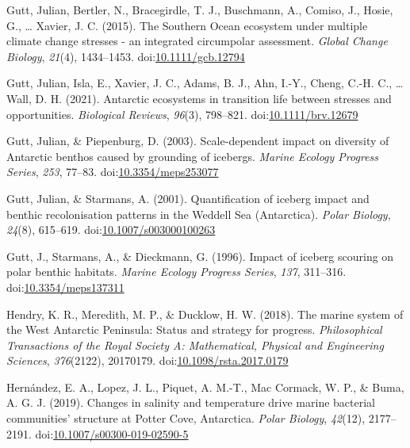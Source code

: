\documentclass[
]{article}
\newlength{\cslhangindent}
\newlength{\cslentryspacingunit} %
\newenvironment{CSLReferences}[2] %
 {%
  \setlength{\parindent}{0pt}
  \ifodd #1
  \let\oldpar\par
  \def\par{\hangindent=\cslhangindent\oldpar}
  \fi
  \setlength{\parskip}{#2\cslentryspacingunit}
 }%
 {}
\begin{document}
\begin{CSLReferences}{1}{0}
\leavevmode{}%
Gutt, Julian, Bertler, N., Bracegirdle, T. J., Buschmann, A., Comiso,
J., Hosie, G., \ldots{} Xavier, J. C. (2015). The {Southern Ocean}
ecosystem under multiple climate change stresses - an integrated
circumpolar assessment. \emph{Global Change Biology}, \emph{21}(4),
1434--1453.
doi:\href{https://doi.org/10.1111/gcb.12794}{10.1111/gcb.12794}

\leavevmode{}%
Gutt, Julian, Isla, E., Xavier, J. C., Adams, B. J., Ahn, I.-Y., Cheng,
C.-H. C., \ldots{} Wall, D. H. (2021). Antarctic ecosystems in
transition \textendash{} life between stresses and opportunities.
\emph{Biological Reviews}, \emph{96}(3), 798--821.
doi:\href{https://doi.org/10.1111/brv.12679}{10.1111/brv.12679}

\leavevmode{}%
Gutt, Julian, \& Piepenburg, D. (2003). Scale-dependent impact on
diversity of {Antarctic} benthos caused by grounding of icebergs.
\emph{Marine Ecology Progress Series}, \emph{253}, 77--83.
doi:\href{https://doi.org/10.3354/meps253077}{10.3354/meps253077}

\leavevmode{}%
Gutt, Julian, \& Starmans, A. (2001). Quantification of iceberg impact
and benthic recolonisation patterns in the {Weddell Sea} ({Antarctica}).
\emph{Polar Biology}, \emph{24}(8), 615--619.
doi:\href{https://doi.org/10.1007/s003000100263}{10.1007/s003000100263}

\leavevmode{}%
Gutt, J., Starmans, A., \& Dieckmann, G. (1996). Impact of iceberg
scouring on polar benthic habitats. \emph{Marine Ecology Progress
Series}, \emph{137}, 311--316.
doi:\href{https://doi.org/10.3354/meps137311}{10.3354/meps137311}

\leavevmode{}%
Hendry, K. R., Meredith, M. P., \& Ducklow, H. W. (2018). The marine
system of the {West Antarctic Peninsula}: Status and strategy for
progress. \emph{Philosophical Transactions of the Royal Society A:
Mathematical, Physical and Engineering Sciences}, \emph{376}(2122),
20170179.
doi:\href{https://doi.org/10.1098/rsta.2017.0179}{10.1098/rsta.2017.0179}

\leavevmode{}%
Hernández, E. A., Lopez, J. L., Piquet, A. M.-T., Mac Cormack, W. P., \&
Buma, A. G. J. (2019). Changes in salinity and temperature drive marine
bacterial communities' structure at {Potter Cove}, {Antarctica}.
\emph{Polar Biology}, \emph{42}(12), 2177--2191.
doi:\href{https://doi.org/10.1007/s00300-019-02590-5}{10.1007/s00300-019-02590-5}


\end{CSLReferences}
\end{document}
